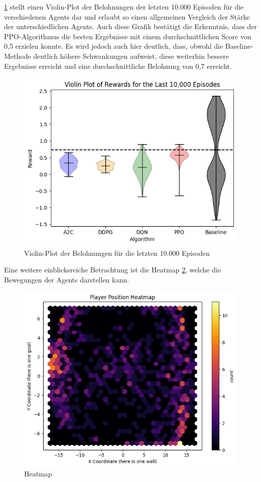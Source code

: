 \documentclass[twocolumn]{webofc}
\begin{document}
\ref{fig:bild2} stellt einen Violin-Plot der Belohnungen der letzten 10.000 Episoden für die verschiedenen Agents dar und erlaubt so einen allgemeinen Vergleich der Stärke der unterschiedlichen Agents. Auch diese Grafik bestätigt die Erkenntnis, dass der \ac{PPO}-Algorithmus die besten Ergebnisse mit einem durchschnittlichen Score von 0,5 erzielen konnte. Es wird jedoch auch hier deutlich, dass, obwohl die Baseline-Methode deutlich höhere Schwankungen aufweist, diese weiterhin bessere Ergebnisse erreicht und eine durchschnittliche Belohnung von 0,7 erreicht.

\begin{figure}[h]
	\centering
   \includegraphics[width=\columnwidth]{img/example2.jpeg}
	\caption{Violin-Plot der Belohnungen für die letzten 10.000 Episoden}
	\label{fig:bild2}
\end{figure}

Eine weitere einblicksreiche Betrachtung ist die Heatmap \ref{fig:bild3}, welche die Bewegungen der Agents darstellen kann.
\begin{figure}[h]
	\centering
	\includegraphics[width=\columnwidth]{img/example3.jpeg}
	\caption{Heatmap}
	\label{fig:bild3}
\end{figure}
\end{document}
